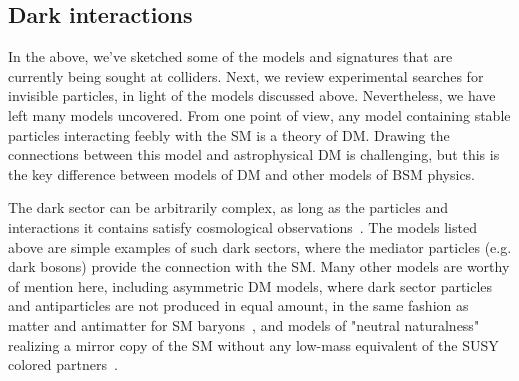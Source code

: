 \subsection{Dark interactions}
\label{sec:darkint}

In the above, we've sketched some of the models and signatures that are currently being sought at colliders. Next, we review experimental searches for invisible particles, in light of the models discussed above. Nevertheless, we have left many models uncovered. From one point of view, any model containing stable particles interacting feebly with the SM is a theory of DM. Drawing the connections between this model and astrophysical DM is challenging, but this is the key difference between models of DM and other models of BSM physics. 

The dark sector can be arbitrarily complex, as long as the particles and interactions it contains satisfy cosmological observations~\cite{Strassler:2006im, Evans:2017kti}. The models listed above are simple examples of such dark sectors, where the mediator particles (e.g. dark bosons) provide the connection with the SM. Many other models are worthy of mention here, including asymmetric DM models, where dark sector particles and antiparticles are not produced in equal amount, in the same fashion as matter and antimatter for SM baryons~\cite{Zurek:2013wia}, and models of "neutral naturalness" realizing a mirror copy of the SM without any low-mass equivalent of the SUSY colored partners~\cite{Craig:2014aea}. 


